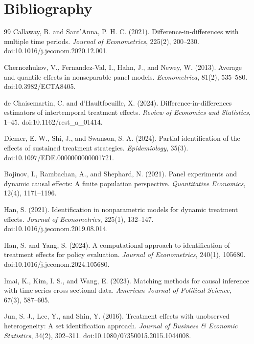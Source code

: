 \documentclass[11pt]{article}
\theoremstyle{definition}
\theoremstyle{plain}
\theoremstyle{remark}
\begin{document}
\section*{Bibliography}
\begin{thebibliography}{99}
Callaway, B. and Sant'Anna, P. H. C. (2021).
Difference-in-differences with multiple time periods.
\emph{Journal of Econometrics}, 225(2), 200--230.
doi:10.1016/j.jeconom.2020.12.001.

Chernozhukov, V., Fernandez-Val, I., Hahn, J., and Newey, W. (2013).
Average and quantile effects in nonseparable panel models.
\emph{Econometrica}, 81(2), 535--580.
doi:10.3982/ECTA8405.

de Chaisemartin, C. and d'Haultfoeuille, X. (2024).
Difference-in-differences estimators of intertemporal treatment effects.
\emph{Review of Economics and Statistics}, 1--45.
doi:10.1162/rest\_a\_01414.

Diemer, E. W., Shi, J., and Swanson, S. A. (2024).
Partial identification of the effects of sustained treatment strategies.
\emph{Epidemiology}, 35(3).
doi:10.1097/EDE.0000000000001721.

Bojinov, I., Rambachan, A., and Shephard, N. (2021).
Panel experiments and dynamic causal effects: A finite population perspective.
\emph{Quantitative Economics}, 12(4), 1171--1196.

Han, S. (2021).
Identification in nonparametric models for dynamic treatment effects.
\emph{Journal of Econometrics}, 225(1), 132--147.
doi:10.1016/j.jeconom.2019.08.014.

Han, S. and Yang, S. (2024).
A computational approach to identification of treatment effects for policy
evaluation.
\emph{Journal of Econometrics}, 240(1), 105680.
doi:10.1016/j.jeconom.2024.105680.

Imai, K., Kim, I. S., and Wang, E. (2023).
Matching methods for causal inference with time-series cross-sectional data.
\emph{American Journal of Political Science}, 67(3), 587--605.

Jun, S. J., Lee, Y., and Shin, Y. (2016).
Treatment effects with unobserved heterogeneity: A set identification approach.
\emph{Journal of Business \& Economic Statistics}, 34(2), 302--311.
doi:10.1080/07350015.2015.1044008.


\end{thebibliography}
\end{document}
